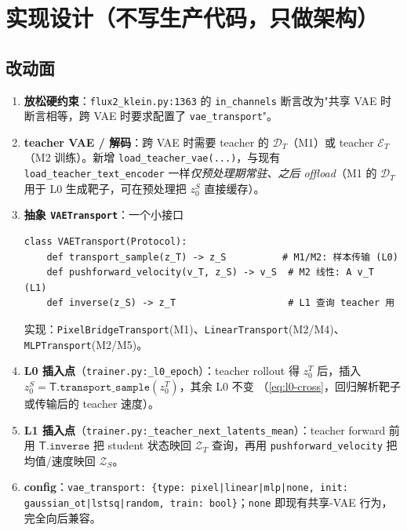 \documentclass[11pt,a4paper]{article}
\newcommand{\Enc}{\mathcal{E}}
\newcommand{\Dec}{\mathcal{D}}
\newcommand{\Zt}{\mathcal{Z}_T}
\newcommand{\Zs}{\mathcal{Z}_S}
\newcommand{\Tmap}{\mathsf{T}}
\theoremstyle{definition}
\begin{document}
\section{实现设计（不写生产代码，只做架构）}
\label{sec:impl}

\subsection{改动面}

\begin{enumerate}[leftmargin=1.5em]
\item \textbf{放松硬约束}：\texttt{flux2\_klein.py:1363} 的 \texttt{in\_channels}
断言改为"共享 VAE 时断言相等，跨 VAE 时要求配置了 \texttt{vae\_transport}"。
\item \textbf{teacher VAE / 解码}：跨 VAE 时需要 teacher 的 $\Dec_T$（M1）或 teacher
$\Enc_T$（M2 训练）。新增 \texttt{load\_teacher\_vae(...)}，与现有
\texttt{load\_teacher\_text\_encoder} 一样\emph{仅预处理期常驻、之后 offload}（M1 的
$\Dec_T$ 用于 L0 生成靶子，可在预处理把 $z_0^S$ 直接缓存）。
\item \textbf{抽象 \texttt{VAETransport}}：一个小接口
\begin{verbatim}
class VAETransport(Protocol):
    def transport_sample(z_T) -> z_S          # M1/M2: 样本传输 (L0)
    def pushforward_velocity(v_T, z_S) -> v_S  # M2 线性: A v_T (L1)
    def inverse(z_S) -> z_T                    # L1 查询 teacher 用
\end{verbatim}
实现：\texttt{PixelBridgeTransport}(M1)、\texttt{LinearTransport}(M2/M4)、
\texttt{MLPTransport}(M2/M5)。
\item \textbf{L0 插入点}（\texttt{trainer.py:\_l0\_epoch}）：teacher rollout 得
$z_0^T$ 后，插入 $z_0^S=\Tmap.\texttt{transport\_sample}(z_0^T)$，其余 L0 不变
（\eqref{eq:l0-cross}，回归解析靶子或传输后的 teacher 速度）。
\item \textbf{L1 插入点}（\texttt{trainer.py:\_teacher\_next\_latents\_mean}）：teacher
forward 前用 $\Tmap.\texttt{inverse}$ 把 student 状态映回 $\Zt$ 查询，再用
\texttt{pushforward\_velocity} 把均值/速度映回 $\Zs$。
\item \textbf{config}：\texttt{vae\_transport: \{type: pixel|linear|mlp|none,
init: gaussian\_ot|lstsq|random, train: bool\}}；\texttt{none} 即现有共享-VAE 行为，
完全向后兼容。
\end{enumerate}
\end{document}
